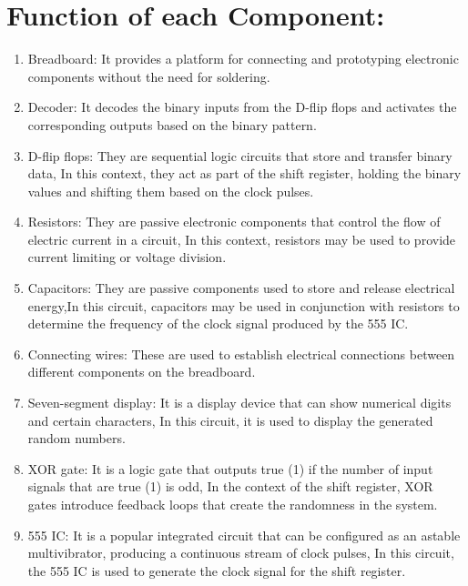 \documentclass[12pt,onecolumn,notitlepage]{article}
\begin{document}
   \section*{Function of each Component:}
\begin{enumerate}
  \setlength\itemsep{0pt}
  \item     Breadboard: It provides a platform for connecting and prototyping electronic components without the need for soldering.

   \item Decoder: It decodes the binary inputs from the D-flip flops and activates the corresponding outputs based on the binary pattern.

   \item  D-flip flops: They are sequential logic circuits that store and transfer binary data, In this context, they act as part of the shift register, holding the binary values and shifting them based on the clock pulses.

    \item Resistors: They are passive electronic components that control the flow of electric current in a circuit, In this context, resistors may be used to provide current limiting or voltage division.

    \item Capacitors: They are passive components used to store and release electrical energy,In this circuit, capacitors may be used in conjunction with resistors to determine the frequency of the clock signal produced by the 555 IC.

    \item Connecting wires: These are used to establish electrical connections between different components on the breadboard.

   \item  Seven-segment display: It is a display device that can show numerical digits and certain characters, In this circuit, it is used to display the generated random numbers.

   \item  XOR gate: It is a logic gate that outputs true (1) if the number of input signals that are true (1) is odd, In the context of the shift register, XOR gates introduce feedback loops that create the randomness in the system.

    \item 555 IC: It is a popular integrated circuit that can be configured as an astable multivibrator, producing a continuous stream of clock pulses, In this circuit, the 555 IC is used to generate the clock signal for the shift register.
\end{enumerate} 
\end{document}

